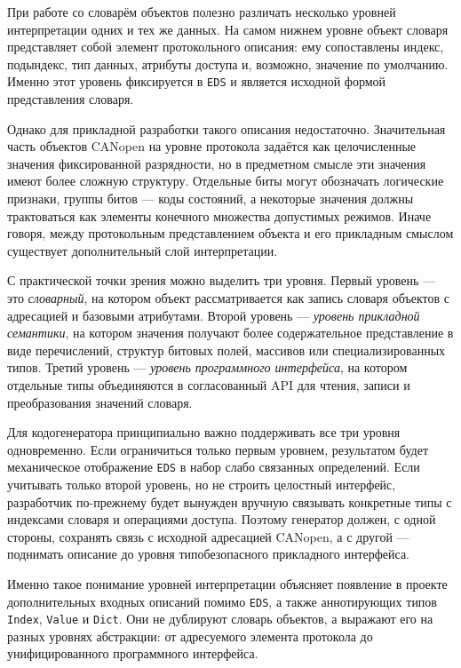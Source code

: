 \documentclass[a4paper,12pt]{article}
\begin{document}
При работе со словарём объектов полезно различать несколько уровней интерпретации
одних и тех же данных. На самом нижнем уровне объект словаря представляет собой
элемент протокольного описания: ему сопоставлены индекс, подындекс, тип данных,
атрибуты доступа и, возможно, значение по умолчанию. Именно этот уровень фиксируется
в \texttt{EDS} и является исходной формой представления словаря.

Однако для прикладной разработки такого описания недостаточно. Значительная часть
объектов CANopen на уровне протокола задаётся как целочисленные значения фиксированной
разрядности, но в предметном смысле эти значения имеют более сложную структуру.
Отдельные биты могут обозначать логические признаки, группы битов --- коды состояний,
а некоторые значения должны трактоваться как элементы конечного множества допустимых
режимов. Иначе говоря, между протокольным представлением объекта и его прикладным
смыслом существует дополнительный слой интерпретации.

С практической точки зрения можно выделить три уровня. Первый уровень --- это
\textit{словарный}, на котором объект рассматривается как запись словаря объектов с
адресацией и базовыми атрибутами. Второй уровень --- \textit{уровень прикладной
семантики}, на котором значения получают более содержательное представление в виде
перечислений, структур битовых полей, массивов или специализированных типов.
Третий уровень --- \textit{уровень программного интерфейса}, на котором отдельные типы
объединяются в согласованный API для чтения, записи и преобразования значений словаря.

Для кодогенератора принципиально важно поддерживать все три уровня одновременно.
Если ограничиться только первым уровнем, результатом будет механическое отображение
\texttt{EDS} в набор слабо связанных определений. Если учитывать только второй уровень,
но не строить целостный интерфейс, разработчик по-прежнему будет вынужден вручную
связывать конкретные типы с индексами словаря и операциями доступа. Поэтому
генератор должен, с одной стороны, сохранять связь с исходной адресацией CANopen, а
с другой --- поднимать описание до уровня типобезопасного прикладного интерфейса.

Именно такое понимание уровней интерпретации объясняет появление в проекте
дополнительных входных описаний помимо \texttt{EDS}, а также аннотирующих типов
\texttt{Index}, \texttt{Value} и \texttt{Dict}. Они не дублируют словарь объектов, а
выражают его на разных уровнях абстракции: от адресуемого элемента протокола до
унифицированного программного интерфейса.
\end{document}

